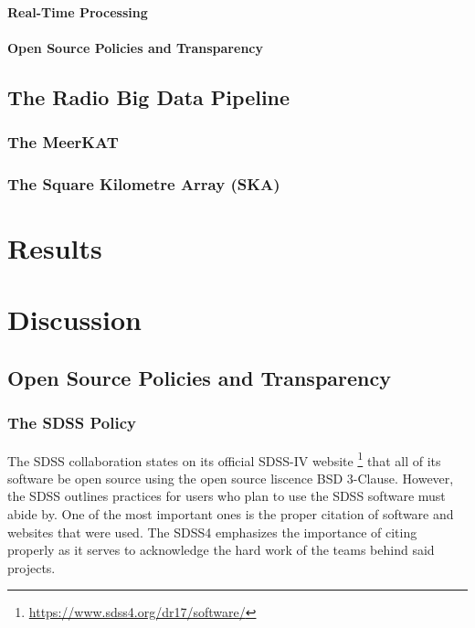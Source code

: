 \documentclass[preprint,linenumbers, longauthor]{aastex631}
\begin{document}
\paragraph{Real-Time Processing}

\paragraph{Open Source Policies and Transparency}


\subsection{The Radio Big Data Pipeline}
\subsubsection{The MeerKAT}

\subsubsection{The Square Kilometre Array (SKA)}

\section{Results}
\subsection{}

\section{Discussion}
\subsection{Open Source Policies and Transparency}

\subsubsection{The SDSS Policy}

The SDSS collaboration states on its official SDSS-IV website \footnote{\url{https://www.sdss4.org/dr17/software/}} that all of its software be open source using the open source liscence BSD 3-Clause.
However, the SDSS outlines practices for users who plan to use the SDSS software must abide by. One of the most important ones is the proper citation of software and websites that were used. 
The SDSS4 emphasizes the importance of citing properly as it serves to acknowledge the hard work of the teams behind said projects.
\end{document}

